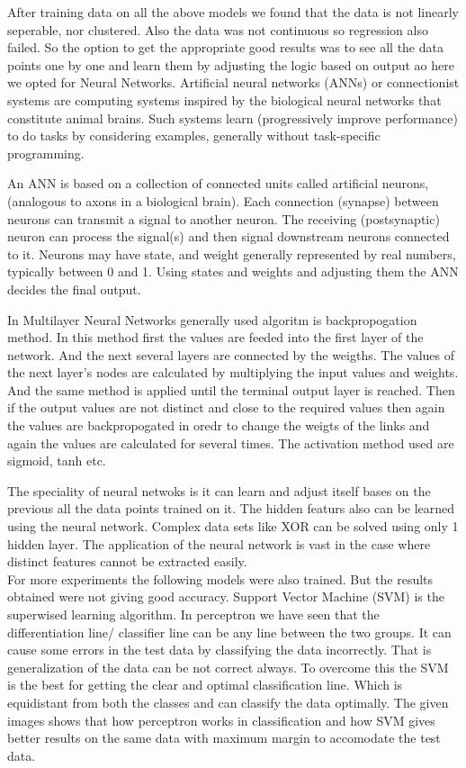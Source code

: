 \documentclass[conference,compsoc]{IEEEtran}
\begin{document}
After training data on all the above models we found that the data is not linearly seperable, nor clustered. Also the data was not continuous so regression also failed. So the option to get the appropriate good results was to see all the data points one by one and learn them by adjusting the logic based on output ao here we opted for Neural Networks.
Artificial neural networks (ANNs) or
connectionist systems are computing systems
inspired by the biological neural networks that
constitute animal brains. Such systems learn
(progressively improve performance) to do tasks
by considering examples, generally without
task-specific programming.

An ANN is based on a collection of
connected units called artificial neurons,
(analogous to axons in a biological brain). Each
connection (synapse) between neurons can
transmit a signal to another neuron. The
receiving (postsynaptic) neuron can process the
signal(s) and then signal downstream neurons
connected to it. Neurons may have state, and
weight generally represented by real numbers,
typically between 0 and 1. Using states and
weights and adjusting them the ANN decides
the final output.

In Multilayer Neural Networks generally
used algoritm is backpropogation method. In
this method first the values are feeded into the
first layer of the network. And the next several
layers are connected by the weigths. The values
of the next layer’s nodes are calculated by
multiplying the input values and weights. And
the same method is applied until the terminal
output layer is reached.
Then if the output values are not distinct
and close to the required values then again the
values are backpropogated in oredr to change
the weigts of the links and again the values are
calculated for several times. The activation method used are sigmoid, tanh etc.

The speciality of neural netwoks is it can learn and adjust itself bases on the previous all the data points trained on it. The hidden featurs also can be learned using the neural network. Complex data sets like XOR can be solved using only 1 hidden layer. The application of the neural network is vast in the case where distinct features cannot be extracted easily.\\

For more experiments the following models were also trained. But the results obtained were not giving good accuracy.
Support Vector Machine (SVM) is the
superwised learning algorithm. In perceptron we
have seen that the differentiation line/ classifier
line can be any line between the two groups. It
can cause some errors in the test data by
classifying the data incorrectly. That is
generalization of the data can be not correct
always.
To overcome this the SVM is the best for
getting the clear and optimal classification line.
Which is equidistant from both the classes and
can classify the data optimally.
The given images shows that how
perceptron works in classification and how
SVM gives better results on the same data with
maximum margin to accomodate the test data.
\end{document}
